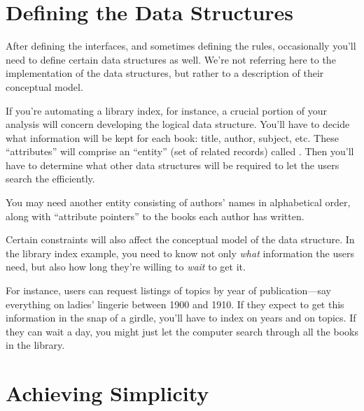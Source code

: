 \section{Defining the Data Structures}%
%
%
%
%

After defining the interfaces, and sometimes defining the rules,
occasionally you'll need to define certain data structures as well.
We're not referring here to the implementation of the data structures,
but rather to a description of their conceptual model.

If you're automating a library index, for instance, a crucial portion
of your analysis will concern developing the logical data structure.
You'll have to decide what information will be kept for each book:
title, author, subject, etc. These ``attributes'' will comprise an
``entity'' (set of related records) called . Then you'll
have to determine what other data structures will be required to let
the users search the  efficiently.




You may need another entity consisting of authors' names in
alphabetical order, along with ``attribute pointers'' to the books
each author has written.

Certain constraints will also affect the conceptual model of the data
structure. In the library index example, you need to know not only
\emph{what} information the users need, but also how long they're
willing to \emph{wait} to get it.

For instance, users can request listings of topics by year of
publication---say everything on ladies' lingerie between 1900 and
1910.  If they expect to get this information in the snap of a girdle,
you'll have to index on years and on topics. If they can wait a day,
you might just let the computer search through all the books in the
library.%
%
%
%

\section{Achieving Simplicity}%
%


